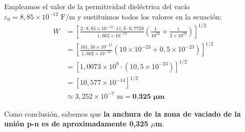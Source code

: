 \documentclass[11pt, a4paper]{article}
\newenvironment{problem}[1][Cuestión]{
	\vspace{0.5cm}
	\noindent{\Large\bfseries #1} \par\vspace{0.5cm}
}{
	\vspace{0.5cm}
}
\begin{document}
\begin{problem}[Cuestión 5]
{			Empleamos el valor de la permitividad dieléctrica del vacío $\varepsilon_0 = 8,85 \times 10^{-12} \text{ F/m}$ y sustituimos todos los valores en la ecuación:
			\begin{align*}
				W &= \left[ \frac{2 \cdot 8,85 \times 10^{-12} \cdot 11,8 \cdot 0,7728}{1,602 \times 10^{-19}} \left( \frac{1}{10^{22}} + \frac{1}{2 \times 10^{23}} \right) \right]^{1/2} \\
				&= \left[ \frac{161,38 \times 10^{-12}}{1,602 \times 10^{-19}} \left( 10 \times 10^{-23} + 0,5 \times 10^{-23} \right) \right]^{1/2} \\
				&= \left[ 1,0073 \times 10^9 \cdot \left( 10,5 \times 10^{-23} \right) \right]^{1/2} \\
				&= \left[ 10,577 \times 10^{-14} \right]^{1/2} \\
				&\approx 3,252 \times 10^{-7} \text{ m} = \textbf{0,325 } \boldsymbol{\mu}\textbf{m}
			\end{align*}

			Como conclusión, sabemos que \textbf{la anchura de la zona de vaciado de la unión p-n es de aproximadamente 0,325 $\mu$m}.
		}
	\end{problem}
\end{document}
